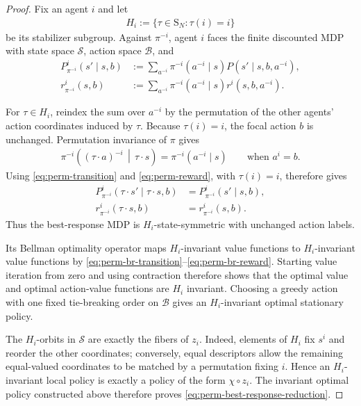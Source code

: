 \documentclass{article}
\theoremstyle{plain}
\theoremstyle{definition}
\theoremstyle{remark}
\newcommand{\St}{\mathcal{S}}
\newcommand{\Sym}{\mathrm{S}}
\begin{document}
\begin{proof}
Fix an agent $i$ and let
\begin{align*}
  H_i
  :=
  \{\tau\in\Sym_N:\tau(i)=i\}
\end{align*}
be its stabilizer subgroup. Against $\pi^{-i}$, agent $i$ faces the finite
discounted MDP with state space $\St$, action space $\mathcal B$, and
\begin{align*}
  P^i_{\pi^{-i}}(s'\mid s,b)
  &:=
  \sum_{a^{-i}}
  \pi^{-i}(a^{-i}\mid s)
  P(s'\mid s,b,a^{-i}),\\
  r^i_{\pi^{-i}}(s,b)
  &:=
  \sum_{a^{-i}}
  \pi^{-i}(a^{-i}\mid s)
  r^i(s,b,a^{-i}).
\end{align*}

For $\tau\in H_i$, reindex the sum over $a^{-i}$ by the permutation of the
other agents' action coordinates induced by $\tau$. Because $\tau(i)=i$,
the focal action $b$ is unchanged. Permutation invariance of $\pi$ gives
\begin{align*}
  \pi^{-i}\!\left(
    (\tau\mathbin{\cdot}a)^{-i}
    \,\middle|\,
    \tau\mathbin{\cdot}s
  \right)
  =
  \pi^{-i}(a^{-i}\mid s)
  \qquad
  \text{when $a^i=b$.}
\end{align*}
Using \eqref{eq:perm-transition} and
\eqref{eq:perm-reward}, with $\tau(i)=i$, therefore gives
\begin{align}
  P^i_{\pi^{-i}}(
    \tau\mathbin{\cdot}s'\mid\tau\mathbin{\cdot}s,b)
  &=
  P^i_{\pi^{-i}}(s'\mid s,b),
  \label{eq:perm-br-transition}\\
  r^i_{\pi^{-i}}(\tau\mathbin{\cdot}s,b)
  &=
  r^i_{\pi^{-i}}(s,b).
  \label{eq:perm-br-reward}
\end{align}
Thus the best-response MDP is $H_i$-state-symmetric with unchanged action
labels.

Its Bellman optimality operator maps $H_i$-invariant value functions to
$H_i$-invariant value functions by
\eqref{eq:perm-br-transition}--\eqref{eq:perm-br-reward}. Starting value
iteration from zero and using contraction therefore shows that the optimal value
and optimal action-value functions are $H_i$ invariant. Choosing a greedy action
with one fixed tie-breaking order on $\mathcal B$ gives an $H_i$-invariant
optimal stationary policy.

The $H_i$-orbits in $\St$ are exactly the fibers of $z_i$. Indeed, elements
of $H_i$ fix $s^i$ and reorder the other coordinates; conversely, equal
descriptors allow the remaining equal-valued coordinates to be matched by a
permutation fixing $i$. Hence an $H_i$-invariant local policy is exactly a policy
of the form $\chi\circ z_i$. The invariant optimal policy constructed above
therefore proves \eqref{eq:perm-best-response-reduction}.


\end{proof}
\end{document}
